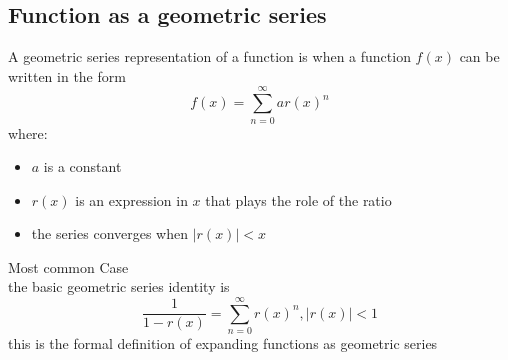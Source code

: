 \documentclass{article}
\begin{document}
                                        \subsection{Function as a geometric series}
                                            A geometric series representation of a function is when a  function \(f(x)\) can be written in the form 
                                                \[f(x) = \sum_{n = 0}^{\infty}ar{(x)}^n\]
                                            where: 
                                            \begin{itemize}
                                                \item \(a\) is a constant 
                                                \item \(r(x)\) is an expression in \(x\) that plays the role of the ratio
                                                \item the series converges when \(|r(x)| < x\)
                                            \end{itemize}
                                            Most common Case\\ 
                                            the basic geometric series identity is 
                                                \[\frac{1}{1 - r(x)} = \sum_{n = 0}^{\infty} r{(x)}^n , |r(x)| < 1\]
                                            this is the formal definition of expanding functions as geometric series 
\end{document}
